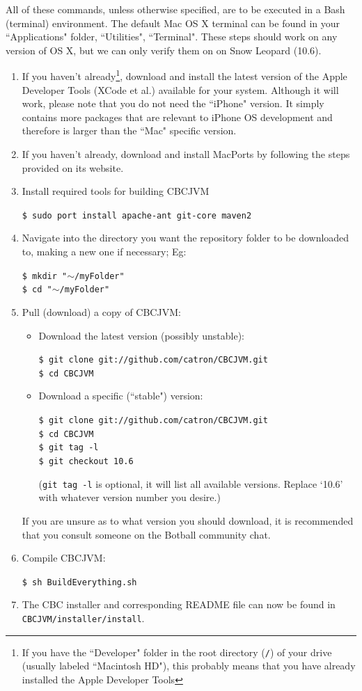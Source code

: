 \documentclass[12pt,letterpaper]{article}
\newcommand{\code}[1]{\par\texttt{#1}\par}
\begin{document}
All of these commands, unless otherwise specified, are to be executed in a Bash (terminal) environment. The default Mac OS X terminal can be found in your ``Applications" folder, ``Utilities", ``Terminal". These steps should work on any version of OS X, but we can only verify them on on Snow Leopard (10.6).
\begin{enumerate}
\item If you haven't already\footnote{If you have the ``Developer" folder in the root directory (\texttt{/}) of your drive (usually labeled ``Macintosh HD"), this probably means that you have already installed the Apple Developer Tools}, download and install the latest version of the Apple Developer Tools (XCode et al.) available for your system. Although it will work, please note that you do not need the ``iPhone" version. It simply contains more packages that are relevant to iPhone OS development and therefore is larger than the ``Mac" specific version.
\item If you haven't already, download and install MacPorts by following the steps provided on its website.
\item Install required tools for building CBCJVM
      \code{\$ sudo port install apache-ant git-core maven2}
\item Navigate into the directory you want the repository folder to be downloaded to, making a new one if necessary; Eg:
      \code{\$ mkdir "$\mathtt{\sim}$/myFolder"\\
            \$ cd "$\mathtt{\sim}$/myFolder"}
\item Pull (download) a copy of CBCJVM:\par
      \begin{itemize}
          \item Download the latest version (possibly unstable):
                \code{\$ git clone git://github.com/catron/CBCJVM.git \\
                      \$ cd CBCJVM}
          \item Download a specific (``stable") version:
                \code{\$ git clone git://github.com/catron/CBCJVM.git \\
                      \$ cd CBCJVM \\
                      \$ git tag -l \\
                      \$ git checkout 10.6}
                (\texttt{git tag -l} is optional, it will list all available versions. Replace `10.6' with whatever version number you desire.)
      \end{itemize}
      If you are unsure as to what version you should download, it is recommended that you consult someone on the Botball community chat.
\item Compile CBCJVM:
      \code{\$ sh BuildEverything.sh}
\item The CBC installer and corresponding README file can now be found in \texttt{CBCJVM/\-installer/\-install}.
\end{enumerate}
\end{document}
